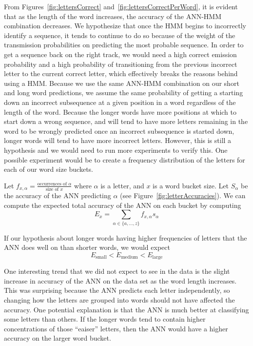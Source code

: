 \documentclass[11pt,letterpaper]{article}
\begin{document}
From Figures~\ref{fig:lettersCorrect} and~\ref{fig:lettersCorrectPerWord}, it is evident that as the length of the word increases, the accuracy of the
ANN-HMM combination decreases. We hypothesize that once the HMM begins to incorrectly identify a
sequence, it tends to continue to do so because of the weight of the transmission probabilities on
predicting the most probable sequence. In order to get a sequence back on the right track, we would
need a high correct emission probability and a high probability of transitioning from the previous
incorrect letter to the current correct letter, which effectively breaks the reasons behind using a
HMM\@. Because we use the same ANN-HMM combination on our short and long word predictions, we assume
the same probability of getting a starting down an incorrect subsequence at a given position in a
word regardless of the length of the word. Because the longer words have more positions at which to
start down a wrong sequence, and will tend to have more letters remaining in the word to be wrongly
predicted once an incorrect subsequence is started down, longer words will tend to have more
incorrect letters. However, this is still a hypothesis and we would need to run more
experiments to verify this. One possible experiment would be to create a frequency distribution of the letters for each of our word size buckets.

Let $f_{x,\alpha}=\frac{\textrm{occurrences of }\alpha}{\textrm{size of }x}$
where $\alpha$ is a letter, and $x$ is a word bucket size. Let $S_\alpha$ be
the accuracy of the ANN predicting $\alpha$ (see Figure~\ref{fig:letterAccuracies}). We can compute the
expected total accuracy of the ANN on each bucket by computing
\begin{equation}
E_x = \sum_{\alpha \in \{a,\ldots, z\}}f_{x,\alpha} s_\alpha
\end{equation}

If our hypothesis about longer words having higher frequencies of letters that the ANN does well on than shorter words, we would expect 
\begin{equation*}
E_{\textrm{small}} < E_{\textrm{medium}} < E_{\textrm{large}}
\end{equation*}


One interesting trend that we did not expect to see in the data is the slight increase in accuracy
of the ANN on the data set as the word length increases. This was surprising because the ANN
predicts each letter independently, so changing how the letters are grouped into words should not
have affected the accuracy. One potential explanation is that the ANN is much better at classifying
some letters than others. If the longer words tend to contain higher concentrations of those
``eaiser'' letters, then the ANN would have a higher accuracy on the larger word bucket. 
\end{document}
